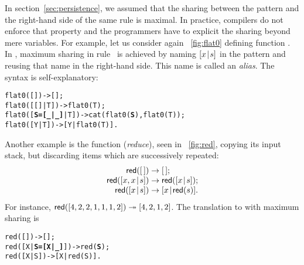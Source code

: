 In section~\ref{sec:persistence}, we assumed that the sharing between
the pattern and the right\hyp{}hand side of the same rule is
maximal. In practice, compilers do not enforce that property and the
programmers have to explicit the sharing beyond mere variables. For
example, let us consider again \fig~\vref{fig:flat0} defining function
. In \Erlang, maximum sharing in
rule~\clause{\gamma} is achieved by naming \([{x}\!\mid\!{s}]\) in the
pattern and reusing that name in the right\hyp{}hand side. This name
is called an \emph{alias}. The syntax is self\hyp{}explanatory:
\begin{alltt}
flat0(         []) -> [];
flat0(     [[]|T]) -> flat0(T);
flat0([\textbf{S=[\_|\_]}|T]) -> cat(flat0(\textbf{S}),flat0(T));\hfill% \emph{Aliasing}
flat0(      [Y|T]) -> [Y|flat0(T)].
\end{alltt}
Another example is the function  (\emph{reduce}), seen in
\fig~\vref{fig:red}, copying its input stack, but discarding items
which are successively repeated:
\begin{equation*}
\begin{array}{@{}r@{\;}l@{\;}l@{}}
\fun{red}(\el)           & \rightarrow & \el;\\
\fun{red}(\cons{x,x}{s}) & \rightarrow & \fun{red}(\cons{x}{s});\\
\fun{red}(\cons{x}{s})   & \rightarrow & \cons{x}{\fun{red}(s)}.
\end{array}
\end{equation*}
For instance, \(\textsf{red}([4,2,2,1,1,1,2]) \twoheadrightarrow
[4,2,1,2]\). The translation to \Erlang with maximum sharing is
\begin{alltt}
red(         []) -> [];
red([X|\textbf{S=[X|\_]}]) -> red(\textbf{S});
red(      [X|S]) -> [X|red(S)].
\end{alltt}

